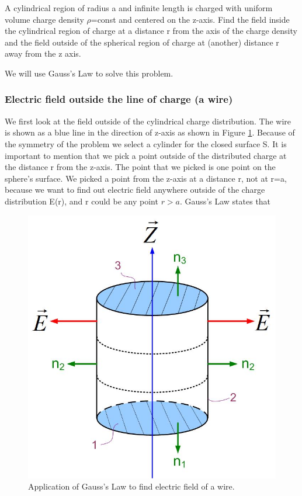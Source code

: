 \documentclass{ximera}
\begin{document}
A cylindrical region of radius a and infinite length is charged with uniform volume charge density $\rho$=const and centered on the z-axis. Find the field inside the cylindrical region of charge at a distance r from the axis of the charge density and the field outside of the spherical region of charge at (another) distance r away from the z axis.

We will use Gauss's Law to solve this problem.



\subsubsection{Electric field outside the line of charge (a wire)}



 We first look at the field  outside of the cylindrical charge distribution. The wire is shown as a blue line in the direction of z-axis as shown in Figure \ref{fig:gaussLineOut}.  Because of the symmetry of the problem we select a cylinder for the closed surface S. It is important to mention that we pick a point outside of the distributed charge at the distance r from the z-axis. The point that we picked is one point on the sphere's surface. We picked a point from the z-axis at a distance r, not at r=a, because we want to find out electric field anywhere outside of the charge distribution E(r), and r could be any point $r>a$. Gauss's Law states that 



\begin{figure}[htbp]
\begin{center}
\includegraphics[scale=0.5]{../jpg/gausslawcylinder.jpg}
\end{center}
\caption{Application of Gauss's Law to find electric field of a wire.}
\label{fig:gaussLineOut}
\end{figure}
\end{document}
